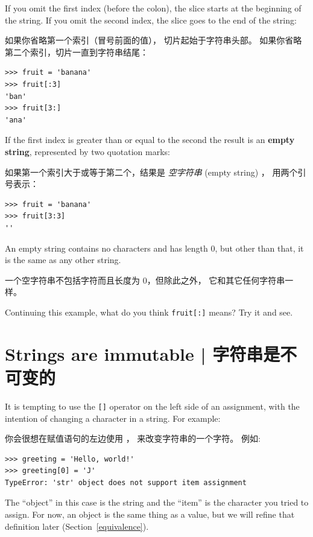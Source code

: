 If you omit the first index (before the colon), the slice starts at
the beginning of the string.  If you omit the second index, the slice
goes to the end of the string:

如果你省略第一个索引（冒号前面的值）， 切片起始于字符串头部。 如果你省略第二个索引，切片一直到字符串结尾：

\begin{lstlisting}
>>> fruit = 'banana'
>>> fruit[:3]
'ban'
>>> fruit[3:]
'ana'
\end{lstlisting}

%
If the first index is greater than or equal to the second the result
is an {\bf empty string}, represented by two quotation marks:

如果第一个索引大于或等于第二个，结果是 {\em 空字符串} (empty string) ， 用两个引号表示：


\begin{lstlisting}
>>> fruit = 'banana'
>>> fruit[3:3]
''
\end{lstlisting}

%
An empty string contains no characters and has length 0, but other
than that, it is the same as any other string.

一个空字符串不包括字符而且长度为 0，但除此之外， 它和其它任何字符串一样。

Continuing this example, what do you think
{\tt fruit[:]} means?  Try it and see.
  


\section{Strings are immutable  |  字符串是不可变的}
    

It is tempting to use the {\tt []} operator on the left side of an
assignment, with the intention of changing a character in a string.
For example:
  

你会很想在赋值语句的左边使用 \li{[]}， 来改变字符串的一个字符。 例如:
  


\begin{lstlisting}
>>> greeting = 'Hello, world!'
>>> greeting[0] = 'J'
TypeError: 'str' object does not support item assignment
\end{lstlisting}

%
The ``object'' in this case is the string and the ``item'' is
the character you tried to assign.  For now, an object is
the same thing as a value, but we will refine that definition
later (Section~\ref{equivalence}).
    
  

